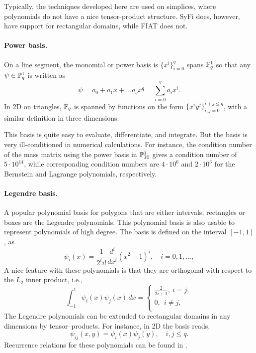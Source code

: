 Typically, the techniques developed  here
are used on simplices, where polynomials do not have a nice
tensor-product structure.  
SyFi does, however, have support for rectangular domains, while  FIAT does not.

\paragraph{Power basis.}
On a line segment, the monomial or power basis is
\( \{ x^i \}_{i=0}^{q} \) spans  $\P^1_q$  so that any \( \psi \in \P^1_q \) is written as
\begin{equation}
\label{pn1d}
\psi = a_0 + a_1 x + \ldots a_q x^q = \sum^q_{i=0} a_i x^i.
\end{equation}
In 2D on triangles, $\P_q$ is spanned by functions on the form
\( \{ x^i y^j \}_{i,j=0}^{i+j\leq q} \), with a similar definition in
three dimensions.

This basis is quite easy to evaluate, differentiate, and
integrate. But the basis is very ill-conditioned in numerical calculations.
For instance, the condition number of the mass matrix using
the power basis in $\P^1_{10}$ gives a condition number of $5\cdot10^{14}$, 
while corresponding condition numbers are $4\cdot 10^6$ and $2\cdot 10^3$ 
for the Bernstein and Lagrange polynomials, respectively.    

\paragraph{Legendre basis.}

A popular polynomial basis for polygons that are either intervals, rectangles or boxes are the Legendre polynomials.
This polynomial basis is also usable to represent polynomials of high degree.
The basis is defined on the interval $[-1,1]$, as
\begin{equation}
\psi_i(x) = \frac{1}{2^i i!} \frac{d^i}{dx^i} (x^2 -1)^i, \quad i=0,1,\ldots,
\end{equation}
A nice feature with these polynomials is that they are orthogonal
with respect to the $L_2$ inner product, i.e.,
\begin{equation}
\int_{-1}^1 \psi_i (x) \psi_j(x) \, dx  =
\left\{
\begin{array}{c}
\frac{2}{2i+1}, \ i=j, \\
0 , \ \ i\not= j, \\
\end{array}
\right.
\end{equation}
The Legendre polynomials can be extended to rectangular domains in any dimensions by tensor--products. 
For instance, in 2D the basis reads, 
\begin{equation}
\psi_{ij}(x,y) = \psi_i(x) \psi_j(y) ,   \quad i,j \leq q. 
\end{equation}
Recurrence relations for these polynomials can be found in \citet{KarniadakisSherwin2005}.  

